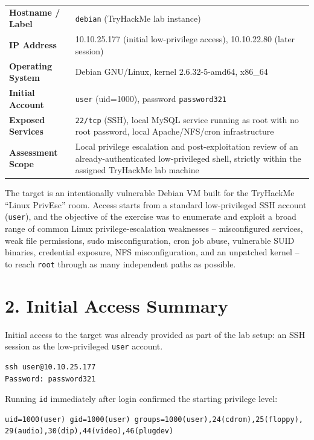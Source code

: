 \documentclass[11pt]{article}
\begin{document}
\begin{infobox}
\begin{tabular}{L{4cm}L{10cm}}
\textbf{Hostname / Label} & \texttt{debian} (TryHackMe lab instance) \\
\textbf{IP Address} & 10.10.25.177 (initial low-privilege access), 10.10.22.80 (later session) \\
\textbf{Operating System} & Debian GNU/Linux, kernel 2.6.32-5-amd64, x86\_64 \\
\textbf{Initial Account} & \texttt{user} (uid=1000), password \texttt{password321} \\
\textbf{Exposed Services} & \texttt{22/tcp} (SSH), local MySQL service running as root with no root password, local Apache/NFS/cron infrastructure \\
\textbf{Assessment Scope} & Local privilege escalation and post-exploitation review of an already-authenticated low-privileged shell, strictly within the assigned TryHackMe lab machine \\
\end{tabular}
\end{infobox}

The target is an intentionally vulnerable Debian VM built for the TryHackMe ``Linux PrivEsc''
room. Access starts from a standard low-privileged SSH account (\texttt{user}), and the objective
of the exercise was to enumerate and exploit a broad range of common Linux privilege-escalation
weaknesses -- misconfigured services, weak file permissions, sudo misconfiguration, cron job
abuse, vulnerable SUID binaries, credential exposure, NFS misconfiguration, and an unpatched
kernel -- to reach \texttt{root} through as many independent paths as possible.

\section{2. Initial Access Summary}

Initial access to the target was already provided as part of the lab setup: an SSH session as the
low-privileged \texttt{user} account.

\begin{lstlisting}
ssh user@10.10.25.177
Password: password321
\end{lstlisting}

Running \texttt{id} immediately after login confirmed the starting privilege level:
\begin{lstlisting}
uid=1000(user) gid=1000(user) groups=1000(user),24(cdrom),25(floppy),
29(audio),30(dip),44(video),46(plugdev)
\end{lstlisting}
\end{document}
